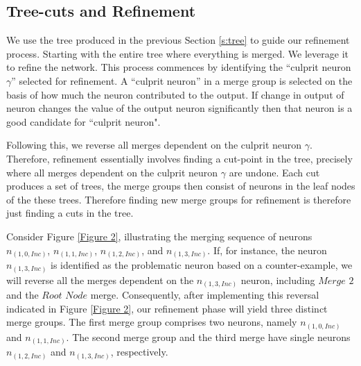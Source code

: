 \subsection{Tree-cuts and Refinement}
\label{s:refinement}





We use the tree produced in the previous Section \ref{s:tree} to guide our
refinement process. Starting with the 
entire tree where everything is merged. We leverage it to refine the network.
This process commences by identifying the ``culprit neuron $\gamma$'' 
selected for refinement. A ``culprit neuron'' in a merge group is selected 
on the basis of how much the neuron contributed to the output. If change in 
output of  neuron changes the value of the output neuron significantly then
that neuron is a good candidate for ``culprit neuron". 

Following this, we reverse all merges dependent on the culprit 
neuron $\gamma$. Therefore, refinement essentially involves finding a 
cut-point in the tree, precisely where all merges dependent on the 
culprit neuron $\gamma$ are undone. Each cut produces a set of trees, 
the merge groups then consist of neurons in the leaf nodes of the  these trees.
Therefore finding new merge groups for refinement is therefore just finding a 
cuts in the tree.


Consider Figure \ref{Figure 2}, illustrating the merging sequence of 
neurons $n_{(1,0,Inc)}$, $n_{(1,1,Inc)}$, $n_{(1,2,Inc)}$, and 
$n_{(1, 3, Inc)}$. If, for instance, the neuron $n_{(1,3,Inc)}$ 
is identified as the problematic neuron based on a counter-example, 
we will reverse all the merges dependent on the $n_{(1,3,Inc)}$ neuron,
 including $\textit{Merge 2}$ and the $\textit{Root Node}$ merge. 
 Consequently, after implementing this reversal indicated in Figure 
 \ref{Figure 2}, our refinement phase will yield three distinct merge groups. 
 The first merge group comprises two neurons, namely $n_{(1,0,Inc)}$ and
 $n_{(1,1, Inc)}$. The second merge group and the third merge have single 
 neurons $n_{(1,2, Inc)}$ and $n_{(1,3,Inc)}$, respectively.

